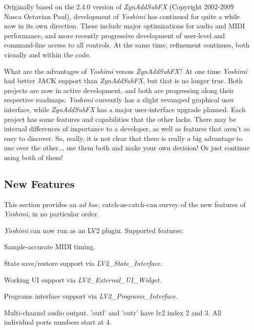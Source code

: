 \documentclass[
 11pt,
 twoside,
 a4paper,
 final                                 %
]{article}
\begin{document}
   Originally based on the 2.4.0 version of \textsl{ZynAddSubFX} (Copyright
   2002-2009 Nasca Octavian Paul), development of \textsl{Yoshimi} has
   continued for quite a while now in its own direction. These include
   major optimizations for audio and MIDI performance, and more recently
   progressive development of user-level and command-line access to all
   controls. At the same time, refinement continues, both visually and within
   the code.

   What are the advantages of
   \textsl{Yoshimi} versus \textsl{ZynAddSubFX}?
   At one time \textsl{Yoshimi} had better JACK support
   than \textsl{ZynAddSubFX}, but that is no longer true.
   Both projects are now in active development, and both are
   progressing along their respective roadmaps.
   \textsl{Yoshimi} currently has a slight revamped graphical user interface,
   while \textsl{ZynAddSubFX} has a major user-interface upgrade planned.
   Each project has some features and capabilities that the other lacks.
   There may be internal differences of importance to
   a developer, as well as features that aren't so easy to discover.  So,
   really, it is not clear that there is really a big advantage to one over the
   other... use them both and make your own decision!  Or just continue using
   both of them!

\subsection{New Features}
\label{subsec:introduction_new_features}

   This section provides an \textsl{ad hoc}, catch-as-catch-can survey of the
   new features of \textsl{Yoshimi}, in no particular order.

   \textsl{Yoshimi} can now run as an LV2 plugin.  Supported features:

   \begin{enumber}
      \item Sample-accurate MIDI timing.
      \item State save/restore support via \textsl{LV2\_State\_Interface}.
      \item Working UI support via \textsl{LV2\_External\_UI\_Widget}.
      \item Programs interface support via \textsl{LV2\_Programs\_Interface}.
      \item Multi-channel audio output.
         'outl' and 'outr' have lv2 index 2 and 3.
         All individual ports numbers start at 4.
   \end{enumber}
\end{document}
